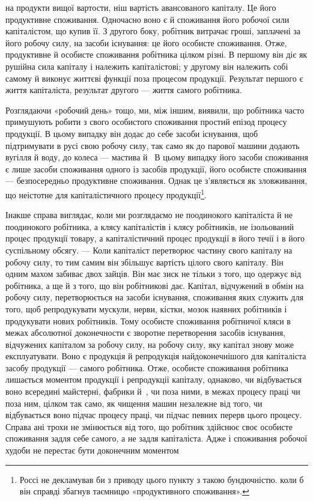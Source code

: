 \parcont{}  %
на продукти вищої вартости, ніш вартість авансованого капіталу.
Це його продуктивне споживання. Одночасно воно є й
споживання його робочої сили капіталістом, що купив її. З другого
боку, робітник витрачає гроші, заплачені за його робочу
силу, на засоби існування: це його особисте споживання. Отже,
продуктивне й особисте споживання робітника цілком різні.
В першому він діє як рушійна сила капіталу і належить капіталістові;
у другому він належить собі самому й виконує життєві
функції поза процесом продукції. Результат першого є життя
капіталіста, результат другого — життя самого робітника.

Розглядаючи «робочий день» тощо, ми, між іншим, виявили,
що робітника часто примушують робити з свого особистого споживання
простий епізод процесу продукції. В цьому випадку
він додає до себе засоби існування, щоб підтримувати в русі
свою робочу силу, так само як до парової машини додають вугілля
й воду, до колеса — мастива й~ В цьому випадку його засоби
споживання є лише засоби споживання одного із засобів продукції,
його особисте споживання — безпосередньо продуктивне
споживання. Однак це з’являється як зловживання, що неістотне
для капіталістичного процесу продукції\footnote{
Россі не декламував би з приводу цього пункту з такою бундючністю.
коли б він справді збагнув таємницю «продуктивного споживання».
}.

Інакше справа виглядає, коли ми розглядаємо не поодинокого
капіталіста й не поодинокого робітника, а клясу капіталістів
і клясу робітників, не ізольований процес продукції товару, а
капіталістичний процес продукції в його течії і в його суспільному
обсягу. — Коли капіталіст перетворює частину свого капіталу
на робочу силу, то тим самим він збільшує вартість цілого
свого капіталу. Він одним махом забиває двох зайців. Він має
зиск не тільки з того, що одержує від робітника, а ще й з того,
що він робітникові дає. Капітал, відчужений в обмін на робочу
силу, перетворюється на засоби існування, споживання яких
служить для того, щоб репродукувати мускули, нерви, кістки,
мозок наявних робітників і продукувати нових робітників. Тому
особисте споживання робітничої кляси в межах абсолютної
доконечности є зворотне перетворення засобів існування, відчужених
капіталом за робочу силу, на робочу силу, яку капітал
знову може експлуатувати. Воно є продукція й репродукція
найдоконечнішого для капіталіста засобу продукції — самого
робітника. Отже, особисте споживання робітника лишається
моментом продукції і репродукції капіталу, однаково, чи відбувається
воно всередині майстерні, фабрики й~, чи поза ними,
в межах процесу праці чи поза ним, цілком так само, як чищення
машин незалежне від того, чи відбувається воно підчас процесу
праці, чи підчас певних перерв цього процесу. Справа ані
трохи не змінюється від того, що робітник здійснює своє особисте
споживання задля себе самого, а не задля капіталіста. Адже і
споживання робочої худоби не перестає бути доконечним моментом
\parbreak{}  %

